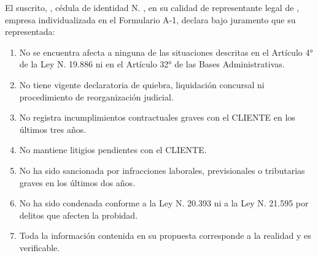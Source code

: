 \documentclass[carta,firma]{lafrox}
\begin{document}
\portadalafrox


El suscrito, \LFXrepresentante, cédula de identidad N.\textdegree{} \LFXcedularepresentante, en su calidad de representante legal de \LFXempresa, empresa individualizada en el Formulario A-1, declara bajo juramento que su representada:

\begin{enumerate}
  \item No se encuentra afecta a ninguna de las situaciones descritas en el Artículo 4° de la Ley N.\textdegree{} 19.886 ni en el Artículo 32° de las Bases Administrativas.
  \item No tiene vigente declaratoria de quiebra, liquidación concursal ni procedimiento de reorganización judicial.
  \item No registra incumplimientos contractuales graves con el CLIENTE en los últimos tres años.
  \item No mantiene litigios pendientes con el CLIENTE.
  \item No ha sido sancionada por infracciones laborales, previsionales o tributarias graves en los últimos dos años.
  \item No ha sido condenada conforme a la Ley N.\textdegree{} 20.393 ni a la Ley N.\textdegree{} 21.595 por delitos que afecten la probidad.
  \item Toda la información contenida en su propuesta corresponde a la realidad y es verificable.
\end{enumerate}

\bloquefirma
\constancianotarialsimulada
\end{document}
